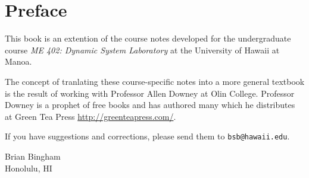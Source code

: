 \chapter{Preface}

This book is an extention of the course notes developed for the undergraduate course \emph{ME 402: Dynamic System Laboratory} at the University of Hawaii at Manoa.  

The concept of tranlating these course-specific notes into a more general textbook is the result of working with Professor Allen Downey at Olin College.  Professor Downey is a prophet of free books and has authored many which he distributes at Green Tea Press \url{http://greenteapress.com/}.

If you have suggestions and corrections, please send them to
{\tt bsb@hawaii.edu}.

\vspace{0.25in}

\noindent Brian Bingham \\
\noindent Honolulu, HI 

